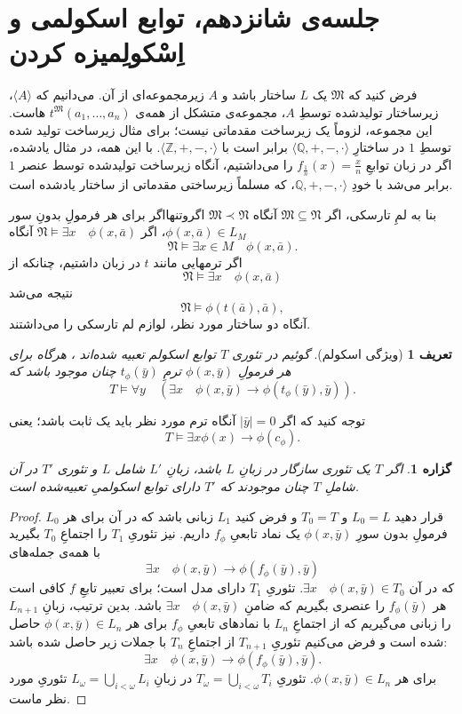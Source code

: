 \documentclass[12pt,a4paper]{report}
\theoremstyle{colorhead}
\newtheorem{prop}[thm]{گزاره}
\newtheorem{defn}[thm]{تعریف}
\begin{document}
\section{جلسه‌ی شانزدهم، توابع اسکولمی و اِسْکولِمیزه کردن}
فرض کنید که
$\mathfrak{M}$
یک 
$L$
ساختار باشد و 
$A$
زیرمجموعه‌ای از آن. می‌دانیم که 
$\langle A\rangle$،
زیرساختار تولیدشده توسطِ 
$A$،
مجموعه‌ی متشکل از همه‌ی
$t^\mathfrak{M}(a_1,\ldots,a_n)$
هاست. این مجموعه،‌ لزوماً یک زیرساخت مقدماتی نیست؛ برای مثال
زیرساخت تولید شده توسطِ
$1$
در ساختارِ
$\langle \mathbb{Q},+,-,\cdot\rangle$
برابر است با
$\langle \mathbb{Z},+,-,\cdot\rangle$.
با این همه، در مثال یادشده، اگر در زبان توابعِ
$f_{\frac{1}{n}}(x)=\frac{x}{n}$
را می‌داشتیم، آنگاه زیرساخت تولیدشده توسط عنصر
$1$
برابر می‌شد با خودِ
$\mathbb{Q},+,-,\cdot\rangle$، 
که مسلماً زیرساختی مقدماتی از ساختار یادشده است.
\par 
بنا به لمِ تارسکی، اگر
$\mathfrak{M}\subseteq \mathfrak{N}$
آنگاه
$\mathfrak{M}\prec \mathfrak{N}$
اگروتنهااگر برای هر فرمولِ بدونِ سور
$\phi(x,\bar{a})\in L_M$،
اگر
$\mathfrak{N}\models \exists x \quad \phi(x,\bar{a})$
آنگاه
\[
\mathfrak{N}\models \exists x\in M\quad \phi(x,\bar{a}).
\]
اگر ترمهایی  مانند
$t$
در زبان داشتیم، چنانکه از
\[
\mathfrak{N}\models \exists x \quad \phi(x,\bar{a})
\]
نتیجه می‌شد
\[
\mathfrak{N}\models \phi(t(\bar{a}),\bar{a}),
\]
آنگاه دو ساختار مورد نظر، لوازم لم تارسکی را می‌داشتند. 
\begin{defn}[ویژگی اسکولم]
گوئیم در
تئوری
$T$
توابع اسکولم تعبیه شده‌اند 
،
هرگاه برای هر فرمولِ
$\phi(x,\bar{y})$
ترمِ
$t_\phi(\bar{y})$
چنان موجود باشد که 
\[
T\models \forall y\quad \left( \exists x\quad \phi(x,\bar{y})\to \phi(t_\phi(\bar{y}),\bar{y})\right).
\]
\end{defn}
توجه کنید که اگر
$|\bar{y}|=0$
آنگاه ترم مورد نظر باید یک ثابت باشد؛ یعنی
\[
T\models \exists x \phi(x)\to \phi(c_\phi).
\]
\begin{prop}
اگر 
$T$
یک تئوری سازگار 
در زبانِ
$L$
باشد، 
زبانِ
$L'$
شامل
$L$
و تئوری
$T'$
در آن شاملِ
$T$
چنان موجودند که 
$T'$
دارای توابع اسکولمیِ	 تعبیه‌شده است.
\end{prop}
\begin{proof}
قرار دهید
$L_0=L$
و
$T_0=T$
و فرض کنید
$L_1$
زبانی باشد که در آن برای هر
$L_0$
فرمولِ
بدون سورِ
$\phi(x,\bar{y})$
یک نماد تابعیِ
$f_\phi$
داریم. نیز تئوریِ
$T_1$
را اجتماعِ
$T_0$
بگیرید با همه‌ی جمله‌های
\[
\exists x\quad \phi(x,\bar{y})\to \phi(f_\phi(\bar{y}),\bar{y})
\]
که در آن
$\exists x\quad \phi(x,\bar{y})\in T_0$.
تئوریِ
$T_1$
دارای مدل است؛ برای تعبیر تابعِ
$f$
کافی است 
هر
$f_\phi(\bar{y})$
را عنصری بگیریم که ضامنِ
$\exists x\quad \phi(x,\bar{y})$
باشد. بدین ترتیب، 
زبانِ
$L_{n+1}$
را زبانی می‌گیریم که از اجتماعِ
$L_n$
با نمادهای تابعیِ
$f_\phi$
برای هر
$\phi(x,\bar{y})\in L_n$
حاصل شده است و فرض می‌کنیم تئوریِ
$T_{n+1}$
از اجتماعِ
$T_n$
با جملات زیر حاصل شده باشد:
\[
\exists x\quad \phi(x,\bar{y})\to \phi(f_\phi(\bar{y}),\bar{y}).
\]
برای هر
$\phi(x,\bar{y})\in L_n$.
تئوریِ
$T_\omega=\bigcup_{i<\omega} T_i$
در زبانِ
$L_\omega=\bigcup_{i<\omega}L_i$
 تئوریِ مورد نظر ماست. 
\end{proof}
\end{document}
